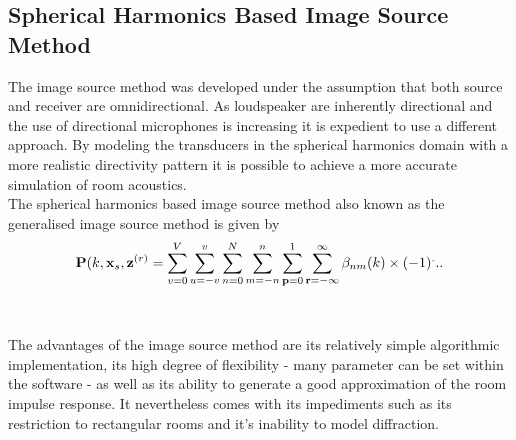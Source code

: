 \subsection{Spherical Harmonics Based Image Source Method}
The image source method was developed under the assumption that both source and receiver are omnidirectional. As loudspeaker are inherently directional and the use of directional microphones is increasing it is expedient to use a different approach. By modeling the transducers in the spherical harmonics domain with a more realistic directivity pattern it is possible to achieve a more accurate simulation of room acoustics.\cite{Samarasinghe2018}\\
The spherical harmonics based image source method also known as the generalised image source method is given by
\begin{equation}
    \mathbf{P}(k,\mathbf{x}_s,\mathbf{z}^{(r)} = \sum_{v=0}^V\sum_{u=-v}^v\sum_{n=0}^N\sum_{m=-n}^n\sum_{\mathbf{p}=0}^1\sum_{\mathbf{r}=-\infty}^\infty\beta_{nm}(k)\\
    \times (-1)^...
\end{equation}
\\
\\The advantages of the image source method are its relatively simple algorithmic implementation, its high degree of flexibility - many parameter can be set within the software - as well as its ability to generate a good approximation of the room impulse response. It nevertheless comes with its impediments such as its restriction to rectangular rooms and it's inability to model diffraction.\cite{Samarasinghe2018}